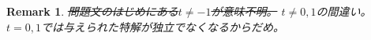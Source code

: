 \documentclass{jsarticle}
\newtheorem{remark}{Remark}
\begin{document}
\begin{comment}
\begin{remark}
よくある問題は特殊解を一つ与えた上で、
非同次方程式の一般解を求めさせる問題だが、
この問題は特殊解を(複数個)
先に与えている、という点において目新しい。
よくよく考えると、微分方程式を与えると、
(一般解に対応する)解空間を考えることができるが、
この問題は、解空間の中の有限個の点から解空間全体を復元できることも主張している。
線形空間であれば、次元の数のぶんだけ解を用意すればよいが、
今回は線形空間でもない、という点においても非常に面白い問題であると思う。
\end{remark}
\end{comment}

\begin{remark}
\sout{問題文のはじめにある$t\ne -1$が意味不明。}
$t\ne 0,1$の間違い。$t=0,1$では与えられた特解が独立でなくなるからだめ。
\end{remark}
\end{document}
